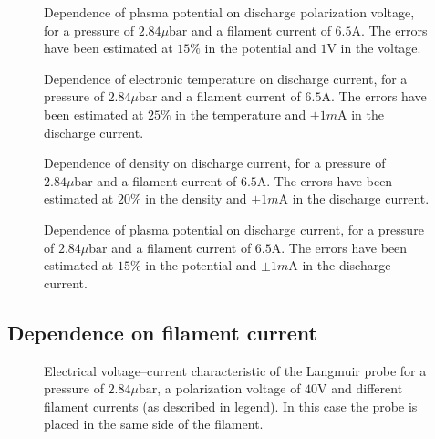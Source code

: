 \documentclass[11pt,a4 paper]{article}
\begin{document}
\begin{figure}[H]
	\centering
	\caption{Dependence of plasma potential on discharge polarization voltage, for a pressure of $2.84\si{\mu\bar}$ and a filament current of $6.5\si{\ampere}$. The errors have been estimated at $15\%$ in the potential and $1\si{\volt}$ in the voltage.}
	\label{fig:Lang:Vp}
\end{figure}

\begin{figure}[H]
	\centering
	\caption{Dependence of electronic temperature on discharge current, for a pressure of $2.84\si{\mu\bar}$ and a filament current of $6.5\si{\ampere}$. The errors have been estimated at $25\%$ in the temperature and $\pm1\si{m\ampere}$ in the discharge current.}
	\label{fig:Lang:Te_c}
\end{figure}

\begin{figure}[H]
	\centering
	\caption{Dependence of density on discharge current, for a pressure of $2.84\si{\mu\bar}$ and a filament current of $6.5\si{\ampere}$. The errors have been estimated at $20\%$ in the density and $\pm1\si{m\ampere}$ in the discharge current.}
	\label{fig:Lang:n_c}
\end{figure}

\begin{figure}[H]
	\centering
	\caption{Dependence of plasma potential on discharge current, for a pressure of $2.84\si{\mu\bar}$ and a filament current of $6.5\si{\ampere}$. The errors have been estimated at $15\%$ in the potential and $\pm1\si{m\ampere}$ in the discharge current.}
	\label{fig:Lang:Vp_c}
\end{figure}

\subsection{Dependence on filament current}

\begin{figure}[H]
	\centering
	\caption{Electrical voltage--current characteristic of the Langmuir probe for a pressure of $2.84\si{\mu\bar}$, a polarization voltage of $40\si{\volt}$ and different filament currents (as described in legend). In this case the probe is placed in the same side of the filament.}
	\label{fig:Lang:dx_cur}
\end{figure}
\end{document}
